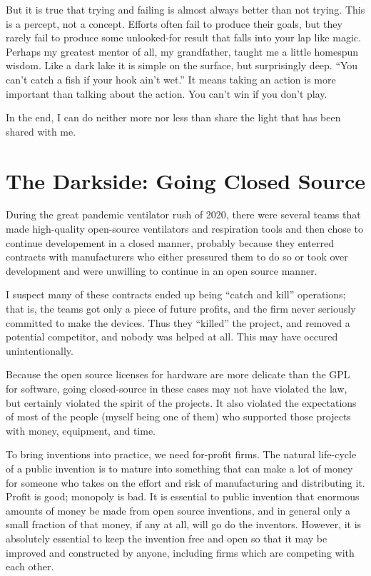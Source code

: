\documentclass[
	fontsize=10pt, %
	twoside=false, %
	secnumdepth=1, %
]{kaobook}
\begin{document}
But it is true that trying and failing is almost always better than
not trying. This is a percept, not a
concept.
Efforts often fail to produce their goals, but they rarely
fail to produce some unlooked-for result that falls into your lap like
magic.
Perhaps my greatest mentor of all, my grandfather, taught me a
little homespun wisdom.
Like a dark lake it is simple on  the surface,
but surprisingly deep.
“You can’t catch a fish if your hook ain’t
wet.”
It means taking an action is more important than talking about
the action.
You can’t win if you don’t play.

In the end, I can do neither more nor less than share the light that
has been shared with me.


\section{The Darkside: Going Closed Source}

During the great pandemic ventilator rush of 2020,
there were several teams that made high-quality
open-source ventilators and respiration tools and
then chose to continue developement in a closed manner,
probably because they enterred contracts with manufacturers
who either pressured them to do so or took over development
and were unwilling to continue in an open source manner.

I suspect many of these contracts ended
up being ``catch and kill'' operations; that is,
the teams got only a piece of future profits, and
the firm never seriously committed to make the devices.
Thus they ``killed'' the project, and removed a potential
competitor, and nobody was helped at all.
This may have occured unintentionally.

Because the open source licenses for hardware are
more delicate than the GPL for software, going
closed-source in these cases may not have violated
the law, but certainly violated the spirit of the
projects.
It also violated the expectations of most
of the people (myself being one of them)
who supported those projects with money,
equipment, and time.

To bring inventions into practice, we need
for-profit firms. The natural life-cycle
of a public invention is to mature into
something that can make a lot of money
for someone who takes on the effort and
risk of manufacturing and distributing it.
Profit is good; monopoly is bad.
It is essential to public invention that
enormous amounts of money be made from open source inventions,
and in general only a small fraction of that money,
if any at all, will go do the inventors.
However, it is absolutely essential to keep the invention
free and open so that it may be improved
and constructed by anyone, including firms
which are competing with each other.
\end{document}
